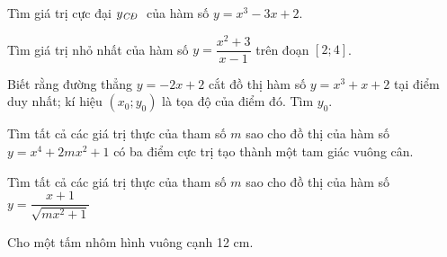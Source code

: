 \begin{vnmultiplechoice}[ rearrange=yes, keycolumns=5]
\begin{question}%
Tìm giá trị cực đại $y_{\mbox{\scriptsize  \textit{CĐ} }}$ của hàm số $y=x^3-3x+2$.
\datcot
\bonpa
{}
{}
{}
{}
\end{question}


\begin{question}%
Tìm giá trị nhỏ nhất của hàm số $y=\dfrac{x^2+3}{x-1}$ trên đoạn $[2;4]$.
\datcot
\bonpa
{}
{}
{}
{}
\end{question}

\begin{question}%
Biết rằng đường thẳng  $y=-2x+2$ cắt đồ thị hàm số
$y=x^3+x+2$ tại điểm
duy nhất; kí hiệu
$(x_0;y_0)$ là tọa độ của điểm đó. Tìm $y_0$.
\datcot
\bonpa
{}
{}
{}
{}
\end{question}

\begin{question}%
Tìm tất cả các giá trị thực của tham số $m$ sao cho đồ thị của hàm số $y=x^4+2mx^2+1$ có ba điểm cực trị tạo thành một tam giác vuông cân.
\datcot
\bonpa
{}
{}
{}
{}
\end{question}


\begin{question}%
Tìm tất cả các giá trị thực của tham số $m$ sao cho đồ thị của hàm số $y=\dfrac{x+1}{\sqrt{m x^2+1}}$
\datcot[4]
\bonpa
{}
{}
{}
{}
\end{question}

\begin{question}%
Cho một tấm nhôm hình vuông cạnh 12 cm.


\end{question}
\end{vnmultiplechoice}
